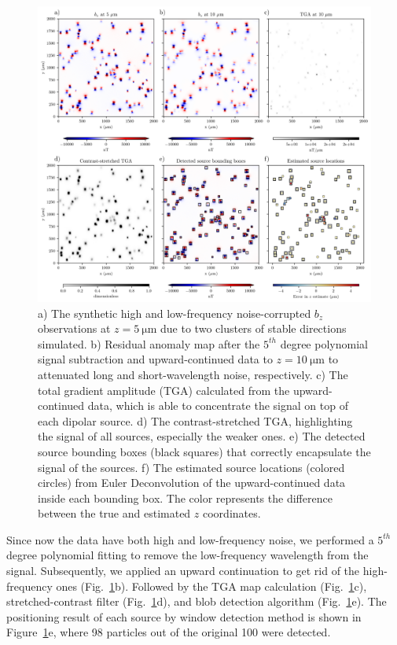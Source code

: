 \begin{figure}[t]
  \centering
  \includegraphics[width=1\linewidth]{figures/complex-synthetic-data.png}
  \caption{
    a) The synthetic high and low-frequency noise-corrupted $b_z$ observations at 
    $z = \qty{5}{\micro\meter}$ due to two clusters of stable directions simulated. 
    b) Residual anomaly map after the $5^{th}$ degree polynomial signal subtraction and upward-continued data to $z = \qty{10}{\micro\meter}$ to attenuated long and short-wavelength noise, respectively.
    c) The total gradient amplitude (TGA) calculated from the 
    upward-continued data, which is able to concentrate the signal on top
    of each dipolar source. 
    d) The contrast-stretched TGA, highlighting the signal of all sources, especially the weaker ones.
    e) The detected source bounding boxes (black squares) that correctly
    encapsulate the signal of the sources.
    f) The estimated source locations (colored circles) from Euler 
    Deconvolution of the upward-continued data inside each bounding box. 
    The color represents the difference between the true and estimated 
    $z$ coordinates.
  }
  \label{complex-synthetic-data}
\end{figure}

Since now the data have both high and low-frequency noise, we performed a $5^{th}$ degree polynomial fitting to remove the low-frequency wavelength from the signal. Subsequently, we applied an upward continuation to get rid of the high-frequency ones (Fig.~\ref{complex-synthetic-data}b). Followed by the TGA map calculation (Fig.~\ref{complex-synthetic-data}c), stretched-contrast filter (Fig.~\ref{complex-synthetic-data}d), and blob detection algorithm (Fig.~\ref{complex-synthetic-data}e). The positioning result of each source by window detection method is shown in Figure~\ref{complex-synthetic-data}e, where 98 particles out of the original 100 were detected. 

